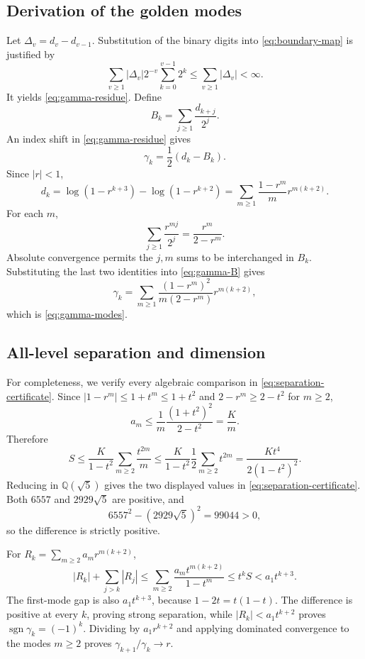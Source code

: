 \subsection{Derivation of the golden modes}

Let \(\Delta_v=d_v-d_{v-1}\).  Substitution of the binary digits into
\eqref{eq:boundary-map} is justified by
\[
  \sum_{v\ge1}|\Delta_v|2^{-v}
  \sum_{k=0}^{v-1}2^k
  \le\sum_{v\ge1}|\Delta_v|<\infty.
\]
It yields \eqref{eq:gamma-residue}.  Define
\[
  B_k=\sum_{j\ge1}\frac{d_{k+j}}{2^j}.
\]
An index shift in \eqref{eq:gamma-residue} gives
\begin{equation}
  \gamma_k=\frac12(d_k-B_k).
  \label{eq:gamma-B}
\end{equation}
Since \(|r|<1\),
\[
  d_k
  =\log(1-r^{k+3})-\log(1-r^{k+2})
  =\sum_{m\ge1}\frac{1-r^m}{m}r^{m(k+2)}.
\]
For each \(m\),
\[
  \sum_{j\ge1}\frac{r^{mj}}{2^j}
  =\frac{r^m}{2-r^m}.
\]
Absolute convergence permits the \(j,m\) sums to be interchanged in \(B_k\).
Substituting the last two identities into \eqref{eq:gamma-B} gives
\[
  \gamma_k=\sum_{m\ge1}
  \frac{(1-r^m)^2}{m(2-r^m)}r^{m(k+2)},
\]
which is \eqref{eq:gamma-modes}.

\subsection{All-level separation and dimension}

For completeness, we verify every algebraic comparison in
\eqref{eq:separation-certificate}.  Since
\(|1-r^m|\le1+t^m\le1+t^2\) and \(2-r^m\ge2-t^2\) for \(m\ge2\),
\[
  a_m\le\frac1m\frac{(1+t^2)^2}{2-t^2}=\frac Km.
\]
Therefore
\[
  S\le\frac{K}{1-t^2}\sum_{m\ge2}\frac{t^{2m}}m
  \le\frac{K}{1-t^2}\frac12\sum_{m\ge2}t^{2m}
  =\frac{Kt^4}{2(1-t^2)^2}.
\]
Reducing in \(\mathbb Q(\sqrt5)\) gives the two displayed values in
\eqref{eq:separation-certificate}.  Both \(6557\) and \(2929\sqrt5\) are
positive, and
\[
  6557^2-(2929\sqrt5)^2=99044>0,
\]
so the difference is strictly positive.

For \(R_k=\sum_{m\ge2}a_mr^{m(k+2)}\),
\[
  |R_k|+\sum_{j>k}|R_j|
  \le\sum_{m\ge2}\frac{a_mt^{m(k+2)}}{1-t^m}
  \le t^kS<a_1t^{k+3}.
\]
The first-mode gap is also \(a_1t^{k+3}\), because
\(1-2t=t(1-t)\).  The difference is positive at every \(k\), proving
strong separation, while \(|R_k|<a_1t^{k+2}\) proves
\(\operatorname{sgn}\gamma_k=(-1)^k\).  Dividing by \(a_1r^{k+2}\)
and applying dominated convergence to the modes \(m\ge2\) proves
\(\gamma_{k+1}/\gamma_k\to r\).


